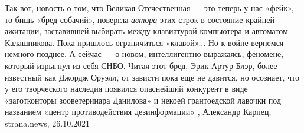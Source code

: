 Так вот, новость о том, что Великая Отечественная — это теперь у нас «фейк», то
бишь «бред собачий», повергла \emph{автора} этих строк в состояние крайней ажитации,
заставившей выбирать между клавиатурой компьютера и автоматом Калашникова. Пока
пришлось ограничиться «клавой»...
Но к войне вернемся немного позднее. А сейчас — о новом, интеллигентно
выражаясь, феномене, который изрыгнул из себя СНБО. Читая этот бред, Эрик Артур
Блэр, более известный как Джордж Оруэлл, от зависти пока еще не давится, но
осознает, что у его творческого наследия появился опаснейший конкурент в виде
«заготконторы зооветеринара Данилова» и некоей грантоедской лавочки под
названием «центр противодействия дезинформации»
, 
Александр Карпец, strana.news, 26.10.2021
